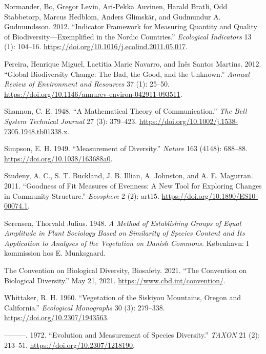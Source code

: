 \documentclass[
  12pt,
  oneside]{report}
\begin{document}
\leavevmode\hypertarget{ref-normander_indicator_2012}{}%
Normander, Bo, Gregor Levin, Ari-Pekka Auvinen, Harald Bratli, Odd Stabbetorp, Marcus Hedblom, Anders Glimskär, and Gudmundur A. Gudmundsson. 2012. ``Indicator Framework for Measuring Quantity and Quality of Biodiversity---Exemplified in the Nordic Countries.'' \emph{Ecological Indicators} 13 (1): 104--16. \url{https://doi.org/10.1016/j.ecolind.2011.05.017}.

\leavevmode\hypertarget{ref-pereira_global_2012}{}%
Pereira, Henrique Miguel, Laetitia Marie Navarro, and Inês Santos Martins. 2012. ``Global Biodiversity Change: The Bad, the Good, and the Unknown.'' \emph{Annual Review of Environment and Resources} 37 (1): 25--50. \url{https://doi.org/10.1146/annurev-environ-042911-093511}.

\leavevmode\hypertarget{ref-shannon_mathematical_1948}{}%
Shannon, C. E. 1948. ``A Mathematical Theory of Communication.'' \emph{The Bell System Technical Journal} 27 (3): 379--423. \url{https://doi.org/10.1002/j.1538-7305.1948.tb01338.x}.

\leavevmode\hypertarget{ref-simpson_measurement_1949}{}%
Simpson, E. H. 1949. ``Measurement of Diversity.'' \emph{Nature} 163 (4148): 688--88. \url{https://doi.org/10.1038/163688a0}.

\leavevmode\hypertarget{ref-studeny_goodness_2011}{}%
Studeny, A. C., S. T. Buckland, J. B. Illian, A. Johnston, and A. E. Magurran. 2011. ``Goodness of Fit Measures of Evenness: A New Tool for Exploring Changes in Community Structure.'' \emph{Ecosphere} 2 (2): art15. \url{https://doi.org/10.1890/ES10-00074.1}.

\leavevmode\hypertarget{ref-sorensen_method_1948}{}%
Sørensen, Thorvald Julius. 1948. \emph{A Method of Establishing Groups of Equal Amplitude in Plant Sociology Based on Similarity of Species Content and Its Application to Analyses of the Vegetation on Danish Commons.} København: I kommission hos E. Munksgaard.

\leavevmode\hypertarget{ref-the_convention_on_biological_diversity_convention_2021}{}%
The Convention on Biological Diversity, Biosafety. 2021. ``The Convention on Biological Diversity.'' May 21, 2021. \url{https://www.cbd.int/convention/}.

\leavevmode\hypertarget{ref-whittaker_vegetation_1960}{}%
Whittaker, R. H. 1960. ``Vegetation of the Siskiyou Mountains, Oregon and California.'' \emph{Ecological Monographs} 30 (3): 279--338. \url{https://doi.org/10.2307/1943563}.

\leavevmode\hypertarget{ref-whittaker_evolution_1972}{}%
---------. 1972. ``Evolution and Measurement of Species Diversity.'' \emph{TAXON} 21 (2): 213--51. \url{https://doi.org/10.2307/1218190}.
\end{document}
